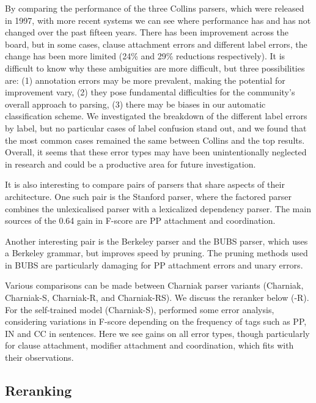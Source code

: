 \begin{landscape}

\end{landscape}

By comparing the performance of the three Collins parsers, which were released in 1997, with more recent systems we can see where performance has and has not changed over the past fifteen years.
There has been improvement across the board, but in some cases, \myeg clause attachment errors and different label errors, the change has been more limited (24\% and 29\% reductions respectively).
It is difficult to know why these ambiguities are more difficult, but three possibilities are:
(1) annotation errors may be more prevalent, making the potential for improvement vary,
(2) they pose fundamental difficulties for the community's overall approach to parsing,
(3) there may be biases in our automatic classification scheme.
We investigated the breakdown of the different label errors by label, but no particular cases of label confusion stand out, and we found that the most common cases remained the same between Collins and the top results.
Overall, it seems that these error types may have been unintentionally neglected in research and could be a productive area for future investigation.

It is also interesting to compare pairs of parsers that share aspects of their
architecture.  One such pair is the Stanford parser, where the factored parser
combines the unlexicalised parser with a lexicalized dependency parser.  The
main sources of the 0.64 gain in F-score are PP attachment and coordination.

Another interesting pair is the Berkeley parser and the BUBS parser, which uses
a Berkeley grammar, but improves speed by pruning.  The pruning methods used in
BUBS are particularly damaging for PP attachment errors and unary errors.

Various comparisons can be made between Charniak parser variants (Charniak, Charniak-S, Charniak-R, and Charniak-RS).
We discuss the reranker below (-R).
For the self-trained model (Charniak-S), \textcite{McClosky-Charniak-Johnson:2006} performed some error analysis,
considering variations in F-score depending on the frequency of tags such as
PP, IN and CC in sentences.  Here we see gains on all error types, though
particularly for clause attachment, modifier attachment and coordination, which
fits with their observations.

\subsection{Reranking} \label{sec:reranking}


